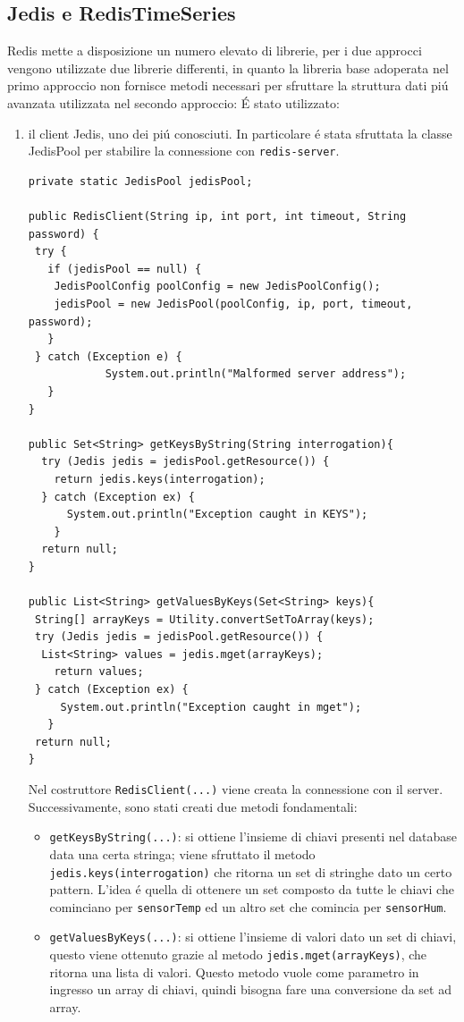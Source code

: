 \subsection{Jedis e RedisTimeSeries}
Redis mette a disposizione un numero elevato di librerie, per i due approcci vengono utilizzate due librerie differenti,
in quanto la libreria base adoperata nel primo approccio non fornisce metodi necessari per sfruttare la struttura dati piú avanzata
utilizzata nel secondo approccio:
É stato utilizzato:
\begin{enumerate}
    \item il client Jedis, uno dei piú conosciuti. In particolare é stata sfruttata la classe JedisPool per stabilire la connessione
    con \texttt{redis-server}.
 \begin{lstlisting}[autogobble, title={\texttt{RedisClient.java}}, style=java]
private static JedisPool jedisPool;

public RedisClient(String ip, int port, int timeout, String password) {
 try {
   if (jedisPool == null) {
    JedisPoolConfig poolConfig = new JedisPoolConfig();
    jedisPool = new JedisPool(poolConfig, ip, port, timeout, password);
   }
 } catch (Exception e) {
            System.out.println("Malformed server address");
   }
}

public Set<String> getKeysByString(String interrogation){
  try (Jedis jedis = jedisPool.getResource()) {
    return jedis.keys(interrogation);
  } catch (Exception ex) {
      System.out.println("Exception caught in KEYS");
    }
  return null;
}

public List<String> getValuesByKeys(Set<String> keys){
 String[] arrayKeys = Utility.convertSetToArray(keys);
 try (Jedis jedis = jedisPool.getResource()) {
  List<String> values = jedis.mget(arrayKeys);
    return values;
 } catch (Exception ex) {
     System.out.println("Exception caught in mget");
   }
 return null;
}
\end{lstlisting}

   Nel costruttore \texttt{RedisClient(...)} viene creata la connessione con il server.\\
   Successivamente, sono stati creati due metodi fondamentali:
    \begin{itemize}
        \item \texttt{getKeysByString(...)}: si ottiene l'insieme di chiavi presenti nel database data una certa stringa;
        viene  sfruttato il metodo \texttt{jedis.keys(interrogation)} che ritorna un set di stringhe dato un certo pattern.
        L'idea é quella di ottenere un set composto da tutte le chiavi che cominciano per \texttt{sensorTemp} ed un altro set
        che comincia per \texttt{sensorHum}.
        \item \texttt{getValuesByKeys(...)}: si ottiene l'insieme di valori dato un set di chiavi, questo viene ottenuto grazie
        al metodo \texttt{jedis.mget(arrayKeys)}, che ritorna una lista di valori.
        Questo metodo vuole come parametro in ingresso
        un array di chiavi, quindi bisogna fare una conversione da set ad array.
    \end{itemize}


\end{enumerate}
